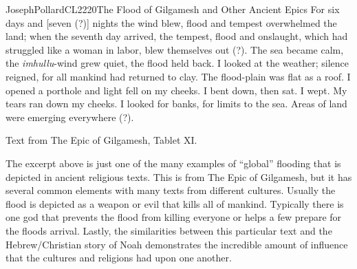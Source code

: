 \documentclass[12pt,letterpaper]{article}
\begin{document}
\begin{mla}{Joseph}{Pollard}{CL2220}{}{}{The Flood of Gilgamesh and Other Ancient Epics}
For six days and [seven (?)] nights the wind blew, flood and tempest overwhelmed the land; when the seventh day arrived, the tempest, flood and onslaught, which had struggled like a woman in labor, blew themselves out (?). The sea became calm, the \emph{imhullu}-wind grew quiet, the flood held back. I looked at the weather; silence reigned, for all mankind had returned to clay. The flood-plain was flat as a roof. I opened a porthole and light fell on my cheeks. I bent down, then sat. I wept. My tears ran down my cheeks. I looked for banks, for limits to the sea. Areas of land were emerging everywhere (?).

Text from The Epic of Gilgamesh, Tablet XI. 

	The excerpt above is just one of the many examples of ``global'' flooding that is depicted in ancient religious texts. This is from The Epic of Gilgamesh, but it has several common elements with many texts from different cultures. Usually the flood is depicted as a weapon or evil that kills all of mankind. Typically there is one god that prevents the flood from killing everyone or helps a few prepare for the floods arrival. Lastly, the similarities between this particular text and the Hebrew/Christian story of Noah demonstrates the incredible amount of influence that the cultures and religions had upon one another.  
\end{mla}
\end{document}
